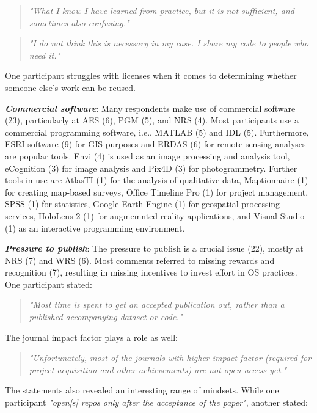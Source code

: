 \documentclass[gc, manuscript]{copernicus}
\begin{document}
\begin{quote}
\textit{"What I know I have learned from practice, but it is not sufficient, and sometimes also confusing."}
\end{quote}

\begin{quote}
\textit{"I do not think this is necessary in my case. I share my code to people who need it."}
\end{quote}

One participant struggles with licenses when it comes to determining
whether someone else's work can be reused.

\textit{\textbf{Commercial software}}: Many respondents make use of
commercial software (23), particularly at AES (6), PGM (5), and NRS (4).
Most participants use a commercial programming software, i.e., MATLAB
(5) and IDL (5). Furthermore, ESRI software (9) for GIS purposes and
ERDAS (6) for remote sensing analyses are popular tools. Envi (4) is
used as an image processing and analysis tool, eCognition (3) for image
analysis and Pix4D (3) for photogrammetry. Further tools in use are
AtlasTI (1) for the analysis of qualitative data, Maptionnaire (1) for
creating map-based surveys, Office Timeline Pro (1) for project
management, SPSS (1) for statistics, Google Earth Engine (1) for
geospatial processing services, HoloLens 2 (1) for augmemnted reality
applications, and Visual Studio (1) as an interactive programming
environment.

\textit{\textbf{Pressure to publish}}: The pressure to publish is a
crucial issue (22), mostly at NRS (7) and WRS (6). Most comments
referred to missing rewards and recognition (7), resulting in missing
incentives to invest effort in OS practices. One participant stated:

\begin{quote}
\textit{"Most time is spent to get an accepted publication out, rather than a published accompanying dataset or code."}
\end{quote}

The journal impact factor plays a role as well:

\begin{quote}
\textit{"Unfortunately, most of the journals with higher impact factor (required for project acquisition and other achievements) are not open access yet."}
\end{quote}

The statements also revealed an interesting range of mindsets. While one
participant
\textit{"open[s] repos only after the acceptance of the paper"}, another
stated:
\end{document}
